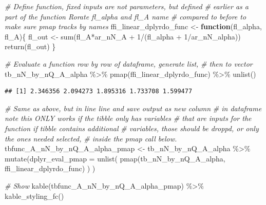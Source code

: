 \documentclass[
]{book}
\newenvironment{Shaded}{\begin{snugshade}}{\end{snugshade}}
\newcommand{\AttributeTok}[1]{\textcolor[rgb]{0.77,0.63,0.00}{#1}}
\newcommand{\CommentTok}[1]{\textcolor[rgb]{0.56,0.35,0.01}{\textit{#1}}}
\newcommand{\ControlFlowTok}[1]{\textcolor[rgb]{0.13,0.29,0.53}{\textbf{#1}}}
\newcommand{\DecValTok}[1]{\textcolor[rgb]{0.00,0.00,0.81}{#1}}
\newcommand{\FunctionTok}[1]{\textcolor[rgb]{0.00,0.00,0.00}{#1}}
\newcommand{\NormalTok}[1]{#1}
\newcommand{\OtherTok}[1]{\textcolor[rgb]{0.56,0.35,0.01}{#1}}
\newcommand{\SpecialCharTok}[1]{\textcolor[rgb]{0.00,0.00,0.00}{#1}}
\begin{document}
\begin{Shaded}
\begin{Highlighting}[]
\CommentTok{\# Define function, fixed inputs are not parameters, but defined}
\CommentTok{\# earlier as a part of the function Rorate fl\_alpha and fl\_A name}
\CommentTok{\# compared to before to make sure pmap tracks by names}
\NormalTok{ffi\_linear\_dplyrdo\_func }\OtherTok{\textless{}{-}} \ControlFlowTok{function}\NormalTok{(fl\_alpha, fl\_A)\{}
\NormalTok{  fl\_out }\OtherTok{\textless{}{-}} \FunctionTok{sum}\NormalTok{(fl\_A}\SpecialCharTok{*}\NormalTok{ar\_nN\_A }\SpecialCharTok{+} \DecValTok{1}\SpecialCharTok{/}\NormalTok{(fl\_alpha }\SpecialCharTok{+} \DecValTok{1}\SpecialCharTok{/}\NormalTok{ar\_nN\_alpha))}
  \FunctionTok{return}\NormalTok{(fl\_out)}
\NormalTok{\}}

\CommentTok{\# Evaluate a function row by row of dataframe, generate list,}
\CommentTok{\# then to vector}
\NormalTok{tb\_nN\_by\_nQ\_A\_alpha }\SpecialCharTok{\%\textgreater{}\%} \FunctionTok{pmap}\NormalTok{(ffi\_linear\_dplyrdo\_func) }\SpecialCharTok{\%\textgreater{}\%} \FunctionTok{unlist}\NormalTok{()}
\end{Highlighting}
\end{Shaded}

\begin{verbatim}
## [1] 2.346356 2.094273 1.895316 1.733708 1.599477
\end{verbatim}

\begin{Shaded}
\begin{Highlighting}[]
\CommentTok{\# Same as above, but in line line and save output as new column}
\CommentTok{\# in dataframe note this ONLY works if the tibble only has variables}
\CommentTok{\# that are inputs for the function if tibble contains additional}
\CommentTok{\#  variables, those should be droppd, or only the ones needed selected,}
\CommentTok{\# inside the pmap call below.}
\NormalTok{tbfunc\_A\_nN\_by\_nQ\_A\_alpha\_pmap }\OtherTok{\textless{}{-}}\NormalTok{ tb\_nN\_by\_nQ\_A\_alpha }\SpecialCharTok{\%\textgreater{}\%}
  \FunctionTok{mutate}\NormalTok{(}\AttributeTok{dplyr\_eval\_pmap =}
           \FunctionTok{unlist}\NormalTok{(}
             \FunctionTok{pmap}\NormalTok{(tb\_nN\_by\_nQ\_A\_alpha, ffi\_linear\_dplyrdo\_func)}
\NormalTok{           )}
\NormalTok{  )}

\CommentTok{\# Show}
\FunctionTok{kable}\NormalTok{(tbfunc\_A\_nN\_by\_nQ\_A\_alpha\_pmap) }\SpecialCharTok{\%\textgreater{}\%}
  \FunctionTok{kable\_styling\_fc}\NormalTok{()}
\end{Highlighting}
\end{Shaded}
\end{document}
